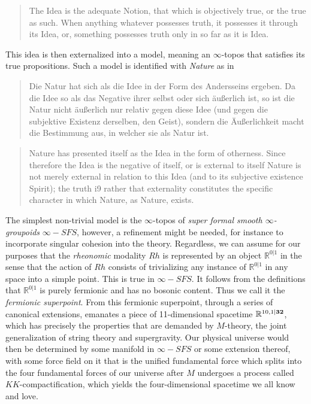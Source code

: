 \documentclass{article}
\begin{document}
\begin{quote}
    The Idea is the adequate Notion, that which is objectively true, or the true as such. When anything
whatever possesses truth, it possesses it through its Idea, or, something possesses truth only in so far
as it is Idea.
\end{quote}

This idea is then externalized into a model, meaning an $\infty$-topos that satisfies its true propositions.
Such a model is identified with \emph{Nature} as in 

\begin{quote}
    Die Natur hat sich als die Idee in der Form des Andersseins ergeben. Da die Idee so als das Negative
ihrer selbst oder sich äußerlich ist, so ist die Natur nicht äußerlich nur relativ gegen diese Idee (und
gegen die subjektive Existenz derselben, den Geist), sondern die Äußerlichkeit macht die Bestimmung aus,
in welcher sie als Natur ist.
\end{quote}

\begin{quote}
    Nature has presented itself as the Idea in the form of otherness. Since therefore the Idea is the
negative of itself, or is external to itself Nature is not merely external in relation to this Idea (and
to its subjective existence Spirit); the truth i9 rather that externality constitutes the specific character
in which Nature, as Nature, exists.
\end{quote}

The simplest non-trivial model is the $\infty$-topos of \emph{super formal smooth $\infty$-groupoids}
$\infty-SFS$, however, a refinement might be needed, for instance to incorporate singular cohesion into
the theory. Regardless, we can assume for our purposes that the \emph{rheonomic} modality $Rh$ is represented
by an object $\mathbb{R}^{0|1}$ in the sense that the action of $Rh$ consists of trivializing any instance
of  $\mathbb{R}^{0|1}$ in any space into a simple point. This is true in $\infty-SFS$. It follows from
the definitions that $\mathbb{R}^{0|1}$ is purely fermionic and has no bosonic content. Thus we call it
the \emph{fermionic superpoint}. From this fermionic superpoint, through a series of canonical extensions,
emanates a piece of 11-dimensional spacetime $\mathbb{R}^{10,1|\textrm{\textbf{32}}}$, which has precisely
the properties that are demanded by $M$-theory, the joint generalization of string theory and supergravity.
Our physical universe would then be determined by some manifold in $\infty-SFS$ or some extension thereof,
with some force field on it that is the unified fundamental force which splits into the four fundamental
forces of our universe after $M$ undergoes a process called $KK$-compactification, which yields the four-dimensional
spacetime we all know and love. \\
\end{document}
